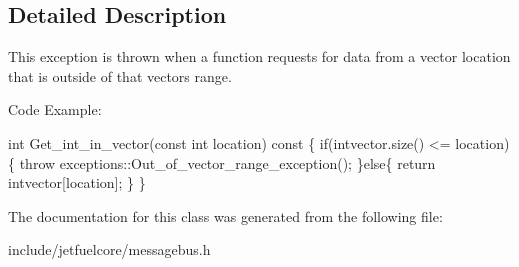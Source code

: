 \subsection{Detailed Description}
This exception is thrown when a function requests for data from a vector location that is outside of that vector\textquotesingle{}s range.

Code Example\+: 
\begin{DoxyCode}
\textcolor{keywordtype}{int} Get\_int\_in\_vector(\textcolor{keyword}{const} \textcolor{keywordtype}{int} location)\textcolor{keyword}{ const }\{
    \textcolor{keywordflow}{if}(intvector.size() <= location)\{
        \textcolor{keywordflow}{throw} exceptions::Out\_of\_vector\_range\_exception();
    \}\textcolor{keywordflow}{else}\{
        \textcolor{keywordflow}{return} intvector[location];
    \}
\}
\end{DoxyCode}
 

The documentation for this class was generated from the following file\+:\begin{DoxyCompactItemize}
\item 
include/jetfuelcore/messagebus.\+h\end{DoxyCompactItemize}
